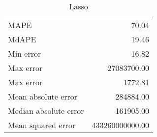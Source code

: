 \begin{table*}[ht]
\begin{minipage}{.3\textwidth}
{\begin{tabular}{@{}lr@{}}
            MAPE & 70.04\\
            MdAPE & 19.46\\
            Min error & 16.82\\
            Max error & 27083700.00\\
            Max error  & 1772.81\\
            Mean absolute error & 284884.00\\
            Median absolute error & 161905.00\\
            Mean squared error & 433260000000.00\\
\bottomrule
\end{tabular}}
\caption{Lasso}
\end{minipage}
\end{table*}

